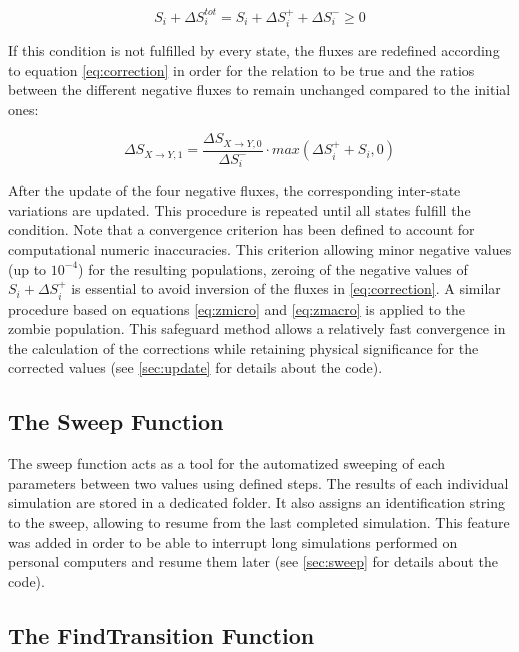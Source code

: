 \documentclass[11pt]{article} %
\begin{document}
\bigskip
\begin{equation} \label{eq:condition}
S_i + \Delta S_i^{tot} = S_i + \Delta S_i^+ + \Delta S_i^- \geq 0
\end{equation}
\bigskip

If this condition is not fulfilled by every state, the fluxes are redefined according to equation \eqref{eq:correction} in order for the relation to be true and the ratios between the different negative fluxes to remain unchanged compared to the initial ones:

\bigskip
\begin{equation} \label{eq:correction}
\Delta S_{X\rightarrow Y,1} = \frac{\Delta S_{X\rightarrow Y,0}}{\Delta S_i^-}\cdot max(\Delta S_i^+ + S_i, 0)
\end{equation}
\bigskip

After the update of the four negative fluxes, the corresponding inter-state variations are updated. This procedure is repeated until all states fulfill the condition. Note that a convergence criterion has been defined to account for computational numeric inaccuracies. This criterion allowing minor negative values (up to $10^{-4}$) for the resulting populations, zeroing of the negative values of $S_i + \Delta S_i^+$ is essential to avoid inversion of the fluxes in \eqref{eq:correction}. A similar procedure based on equations \eqref{eq:zmicro} and \eqref{eq:zmacro} is applied to the zombie population. This safeguard method allows a relatively fast convergence in the calculation of the corrections while retaining physical significance for the corrected values (see \ref{sec:update} for details about the code).



\subsection{The Sweep Function}\indent

The sweep function acts as a tool for the automatized sweeping of each parameters between two values using defined steps. The results of each individual simulation are stored in a dedicated folder. It also assigns an identification string to the sweep, allowing to resume from the last completed simulation. This feature was added in order to be able to interrupt long simulations performed on personal computers and resume them later (see \ref{sec:sweep} for details about the code).


\subsection{The FindTransition Function}\indent
\label{sec:findTransition}
\end{document}
